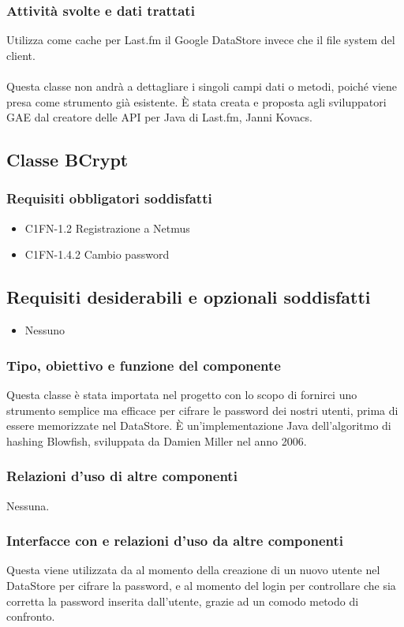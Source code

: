 \subsubsection*{Attivit\`a svolte e dati trattati}
Utilizza come cache per Last.fm il Google DataStore invece che il file system
del client.
\\\\
Questa classe non andr\`a a dettagliare i singoli campi dati o metodi, poich\'e
viene presa come strumento gi\`a esistente. \`E stata creata e proposta agli
sviluppatori GAE dal creatore delle API per Java di Last.fm, Janni Kovacs.

\subsection{Classe BCrypt}
\subsubsection*{Requisiti obbligatori soddisfatti}
\begin{itemize}
    \item C1FN-1.2 Registrazione a Netmus
    \item C1FN-1.4.2 Cambio password
\end{itemize}
\subsection*{Requisiti desiderabili e opzionali soddisfatti}
\begin{itemize}
    \item Nessuno
\end{itemize}
\subsubsection*{Tipo, obiettivo e funzione del componente}
Questa classe \`e stata importata nel progetto con lo scopo di fornirci uno
strumento semplice ma efficace per cifrare le password dei nostri utenti, prima
di essere memorizzate nel DataStore. \`E un'implementazione Java dell'algoritmo
di hashing Blowfish, sviluppata da Damien Miller nel anno 2006.
\subsubsection*{Relazioni d'uso di altre componenti}
Nessuna.
\subsubsection*{Interfacce con e relazioni d'uso da altre componenti}
Questa viene utilizzata da  al momento della creazione di
un nuovo utente nel DataStore per cifrare la password, e al momento del login
per controllare che sia corretta la password inserita dall'utente, grazie ad un
comodo metodo di confronto.
